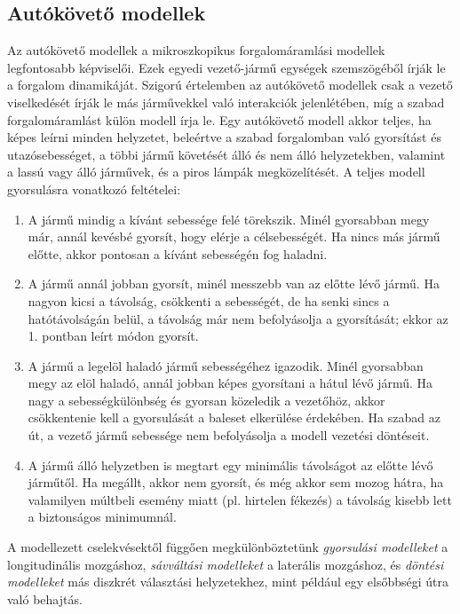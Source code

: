 \documentclass[14pt,a4paper]{extarticle}
\begin{document}
\subsection{Autókövető modellek}
Az autókövető modellek a mikroszkopikus forgalomáramlási modellek legfontosabb képviselői. Ezek egyedi vezető-jármű egységek szemszögéből írják le a forgalom dinamikáját. Szigorú értelemben az autókövető modellek csak a vezető viselkedését írják le más járművekkel való interakciók jelenlétében, míg a szabad forgalomáramlást külön modell írja le.
Egy autókövető modell akkor teljes, ha képes leírni minden helyzetet, beleértve a szabad forgalomban való gyorsítást és utazósebességet, a többi jármű követését álló és nem álló helyzetekben, valamint a lassú vagy álló járművek, és a piros lámpák megközelítését. A teljes modell gyorsulásra vonatkozó feltételei:
\begin{enumerate}
	\item A jármű mindig a kívánt sebessége felé törekszik. Minél gyorsabban megy már, annál kevésbé gyorsít, hogy elérje a célsebességét. Ha nincs más jármű előtte, akkor pontosan a kívánt sebességén fog haladni.
	\item A jármű annál jobban gyorsít, minél messzebb van az előtte lévő jármű. Ha nagyon kicsi a távolság, csökkenti a sebességét, de ha senki sincs a hatótávolságán belül, a távolság már nem befolyásolja a gyorsítását; ekkor  az 1. pontban leírt módon gyorsít.
	\item A jármű a legelöl haladó jármű sebességéhez igazodik. Minél gyorsabban megy az elöl haladó, annál jobban képes gyorsítani a hátul lévő jármű. Ha nagy a sebességkülönbség és gyorsan közeledik a vezetőhöz, akkor csökkentenie kell a gyorsulását a baleset elkerülése érdekében. Ha szabad az út, a vezető jármű sebessége nem befolyásolja a modell vezetési döntéseit.
	\item A jármű álló helyzetben is megtart egy minimális távolságot az előtte lévő járműtől. Ha megállt, akkor nem gyorsít, és még akkor sem mozog hátra, ha valamilyen múltbeli esemény miatt (pl. hirtelen fékezés) a távolság kisebb lett a biztonságos minimumnál.
\end{enumerate}
A modellezett cselekvésektől függően megkülönböztetünk \textit{gyorsulási modelleket} a longitudinális mozgáshoz, \textit{sávváltási modelleket} a laterális mozgáshoz, és \textit{döntési modelleket} más diszkrét választási helyzetekhez, mint például egy elsőbbségi útra való behajtás.
\end{document}
